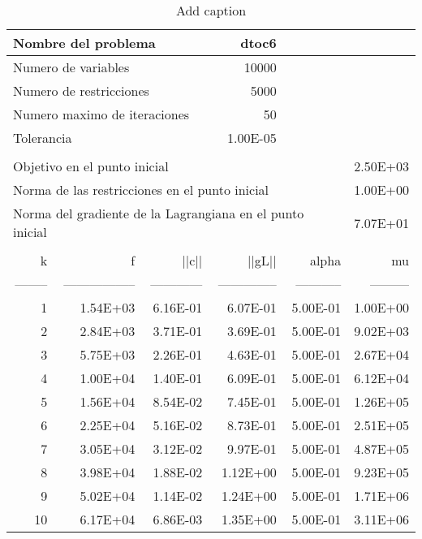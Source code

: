 \begin{table}[htbp]
  \centering
  \caption{Add caption}
    \begin{tabular}{rrrrrr}
    \toprule
    \multicolumn{3}{l}{Nombre del problema} & dtoc6 &       &  \\
    \midrule
    \multicolumn{3}{l}{Numero de variables} & 10000 &       &  \\
    \multicolumn{3}{l}{Numero de restricciones} & 5000  &       &  \\
    \multicolumn{3}{l}{Numero maximo de iteraciones} & 50    &       &  \\
    \multicolumn{3}{l}{Tolerancia} & 1.00E-05 &       &  \\
          &       &       &       &       &  \\
    \multicolumn{5}{l}{Objetivo en el punto inicial} & 2.50E+03 \\
    \multicolumn{5}{l}{Norma de las restricciones en el punto inicial} & 1.00E+00 \\
    \multicolumn{5}{l}{Norma del gradiente de la Lagrangiana en el punto inicial} & 7.07E+01 \\
          &       &       &       &       &  \\
    k     & f     & ||c|| & ||gL||      & alpha & mu \\
    -------- & ----------------- & ------------ & -------------- & ----------- & --------- \\
    1     & 1.54E+03 & 6.16E-01 & 6.07E-01 & 5.00E-01 & 1.00E+00 \\
    2     & 2.84E+03 & 3.71E-01 & 3.69E-01 & 5.00E-01 & 9.02E+03 \\
    3     & 5.75E+03 & 2.26E-01 & 4.63E-01 & 5.00E-01 & 2.67E+04 \\
    4     & 1.00E+04 & 1.40E-01 & 6.09E-01 & 5.00E-01 & 6.12E+04 \\
    5     & 1.56E+04 & 8.54E-02 & 7.45E-01 & 5.00E-01 & 1.26E+05 \\
    6     & 2.25E+04 & 5.16E-02 & 8.73E-01 & 5.00E-01 & 2.51E+05 \\
    7     & 3.05E+04 & 3.12E-02 & 9.97E-01 & 5.00E-01 & 4.87E+05 \\
    8     & 3.98E+04 & 1.88E-02 & 1.12E+00 & 5.00E-01 & 9.23E+05 \\
    9     & 5.02E+04 & 1.14E-02 & 1.24E+00 & 5.00E-01 & 1.71E+06 \\
    10    & 6.17E+04 & 6.86E-03 & 1.35E+00 & 5.00E-01 & 3.11E+06 \\

\end{tabular}
\end{table}
